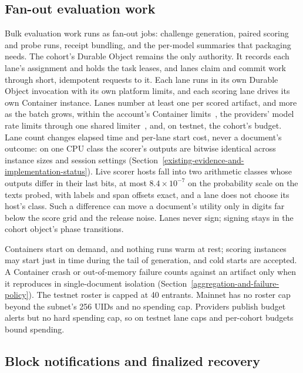 \subsection{Fan-out evaluation work}\label{fan-out}

Bulk evaluation work runs as fan-out jobs: challenge generation, paired scoring
and probe runs, receipt bundling, and the per-model summaries that packaging
needs. The cohort's Durable Object remains the only authority. It records each
lane's assignment and holds the task leases, and lanes claim and commit work
through short, idempotent requests to it. Each lane runs in its own Durable
Object invocation with its own platform limits, and each scoring lane drives its
own Container instance. Lanes number at least one per scored artifact, and more
as the batch grows, within the account's Container limits~\cite{cfcontainerlimits},
the providers' model rate limits through one shared limiter~\cite{cfailimits},
and, on testnet, the cohort's budget. Lane count changes elapsed time and per-lane start
cost, never a document's outcome: on one CPU class the scorer's outputs are
bitwise identical across instance sizes and session settings
(Section~\ref{existing-evidence-and-implementation-status}). Live scorer hosts
fall into two arithmetic classes whose outputs differ in their last bits, at
most \(8.4\times10^{-7}\) on the probability scale on the texts probed, with
labels and span offsets exact, and a lane does not choose its host's class.
Such a difference can move a document's utility only in digits far below the
score grid and the release noise. Lanes never sign; signing stays in the
cohort object's phase transitions.

Containers start on demand, and nothing runs warm at rest; scoring instances may
start just in time during the tail of generation, and cold starts are accepted.
A Container crash or out-of-memory failure counts against an artifact only when
it reproduces in single-document isolation
(Section~\ref{aggregation-and-failure-policy}). The testnet roster is capped at
40 entrants. Mainnet has no roster cap beyond the subnet's 256 UIDs and no
spending cap. Providers publish budget alerts but no hard spending
cap, so on testnet lane caps and per-cohort budgets bound spending.

\subsection{Block notifications and finalized recovery}\label{block-notifications}

